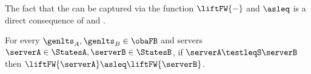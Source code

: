 The fact that the \mustpreorder can be captured via the function $\liftFW{-}$
and $\asleq$ is a direct consequence of 
and .
\begin{proposition}[Completeness]%
  \label{prop:bhv-completeness}
  For every $\genlts_A, \genlts_B \in \obaFB$ and
  servers $\serverA \in \StatesA, \serverB \in \StatesB $,
  if $\serverA \testleqS \serverB$ then $\liftFW{ \serverA } \asleq \liftFW{ \serverB }$.
\end{proposition}
